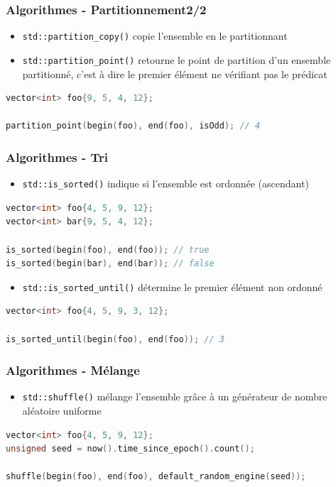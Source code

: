 \documentclass[C++.tex]{subfiles}
\begin{document}
\begin{frame}[fragile]
	\frametitle{Algorithmes - Partitionnement\titlehfill{}2/2}
	\begin{itemize}
		\item \lstinline|std::partition_copy()| copie l'ensemble en le partitionnant
		\item \lstinline|std::partition_point()| retourne le point de partition d'un ensemble partitionné, c'est à dire le premier élément ne vérifiant pas le prédicat
	\end{itemize}

	\begin{lstlisting}[language=C++]
vector<int> foo{9, 5, 4, 12};

partition_point(begin(foo), end(foo), isOdd); // 4\end{lstlisting}
\end{frame}

\begin{frame}[fragile]
	\frametitle{Algorithmes - Tri}
	\begin{itemize}
		\item \lstinline|std::is_sorted()| indique si l'ensemble est ordonnée (ascendant)
	\end{itemize}


	\begin{lstlisting}[language=C++]
vector<int> foo{4, 5, 9, 12};
vector<int> bar{9, 5, 4, 12};

is_sorted(begin(foo), end(foo)); // true
is_sorted(begin(bar), end(bar)); // false\end{lstlisting}

	\begin{itemize}
		\item \lstinline|std::is_sorted_until()| détermine le premier élément non ordonné
	\end{itemize}

	\begin{lstlisting}[language=C++]
vector<int> foo{4, 5, 9, 3, 12};

is_sorted_until(begin(foo), end(foo)); // 3\end{lstlisting}
\end{frame}

\begin{frame}[fragile]
	\frametitle{Algorithmes - Mélange}
	\begin{itemize}
		\item \lstinline|std::shuffle()| mélange l'ensemble grâce à un générateur de nombre aléatoire \og uniforme\fg{}
	\end{itemize}

	\begin{lstlisting}[language=C++]
vector<int> foo{4, 5, 9, 12};
unsigned seed = now().time_since_epoch().count();

shuffle(begin(foo), end(foo), default_random_engine(seed));\end{lstlisting}

\end{frame}
\end{document}
